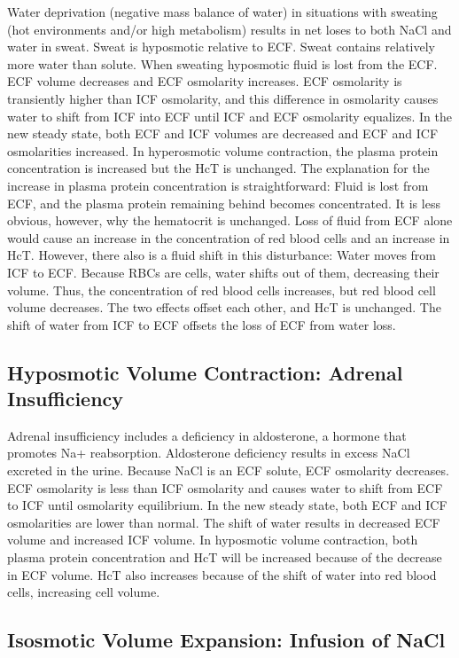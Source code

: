 Water deprivation (negative mass balance of water) in situations with sweating (hot environments and/or high metabolism) results in net loses to both NaCl and water in sweat. Sweat is hyposmotic relative to ECF. Sweat contains relatively more water than solute. When sweating hyposmotic fluid is lost from the ECF. ECF volume decreases and ECF osmolarity increases. ECF osmolarity is transiently higher than ICF osmolarity, and this difference in osmolarity causes water to shift from ICF into ECF until ICF and ECF osmolarity  equalizes. In the new steady state, both ECF and ICF volumes are decreased and ECF and ICF osmolarities increased. In hyperosmotic volume contraction, the plasma protein concentration is increased but the HcT is unchanged. The explanation for the increase in plasma protein concentration is straightforward: Fluid is lost from ECF, and the plasma protein remaining behind becomes concentrated. It is less obvious, however, why the hematocrit is unchanged. Loss of fluid from ECF alone would cause an increase in the concentration of red blood cells and an increase in HcT. However, there also is a fluid shift in this disturbance: Water moves from ICF to ECF. Because RBCs are cells, water shifts out of them, decreasing their volume. Thus, the concentration of red blood cells increases, but red blood cell volume decreases. The two effects offset each other, and HcT is unchanged. The shift of water from ICF to ECF offsets the loss of ECF from water loss.

\subsection{Hyposmotic Volume Contraction: Adrenal Insufficiency}

Adrenal insufficiency includes a deficiency in aldosterone, a hormone that promotes Na+ reabsorption. Aldosterone deficiency results in excess NaCl excreted in the urine. Because NaCl is an ECF solute, ECF osmolarity decreases. ECF osmolarity is less than ICF osmolarity and causes water to shift from ECF to ICF until osmolarity equilibrium. In the new steady state, both ECF and ICF osmolarities are lower than normal. The shift of water results in decreased ECF volume and increased ICF volume. In hyposmotic volume contraction, both plasma protein concentration and HcT will be increased because of the decrease in ECF volume. HcT also increases because of the shift of water into red blood cells, increasing cell volume. 

\subsection{Isosmotic Volume Expansion: Infusion of NaCl} 

